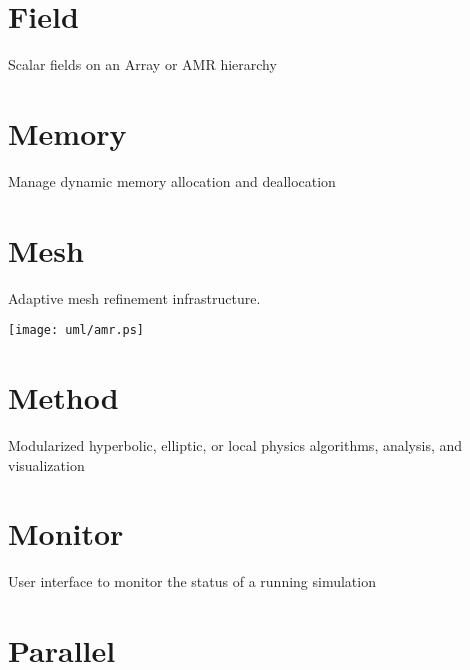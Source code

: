 \documentclass{book}
\begin{document}
\section{Field}

Scalar fields on an Array or AMR hierarchy

\section{Memory}

Manage dynamic memory allocation and deallocation

\section{Mesh}

Adaptive mesh refinement infrastructure.

\centerline{\texttt{[image: uml/amr.ps]}}

\section{Method}

Modularized hyperbolic, elliptic, or local physics algorithms,
analysis, and visualization

\section{Monitor}

User interface to monitor the status of a running simulation

\section{Parallel}
\end{document}
